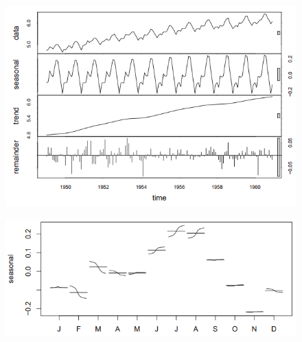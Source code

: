 		\begin{figure}[H]\centering
			\begin{minipage}[c]{0.5\textwidth}
				\includegraphics[width=1\linewidth]{images/tsSTL.png}
				\label{Fig:tsSTL}
			\end{minipage}\hfill
			\begin{minipage}[c]{0.5\textwidth}
				\includegraphics[width=1\linewidth]{images/tsMonthplot.png}
				\label{Fig:tsMonthplot}
			\end{minipage}
		\end{figure}